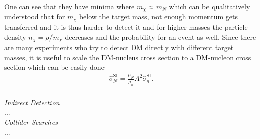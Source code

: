 One can see that they have minima where $m_\chi\approx m_N$ which can be qualitatively understood that for $m_\chi$ 
below the target mass, not enough momentum gets transferred and it is thus harder to detect it and for higher masses the particle density $n_\chi=\rho/m_\chi$
decreases and the probability for an event as well. Since there are many experiments who try to detect DM directly with different target masses,
it is useful to scale the DM-nucleus cross section to a DM-nucleon cross section which can be easily done
\begin{align}
 \hat\sigma_N^\text{SI} = \frac{\mu_N}{\mu_n} A^2 \hat\sigma_n^\text{SI}.
\end{align}
\\ \textit{Indirect Detection} \\
\noindent ...
\\ \textit{Collider Searches}\\
\noindent ...